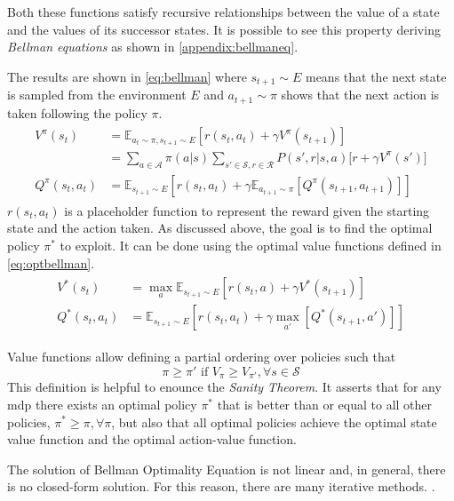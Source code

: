 Both these functions satisfy recursive relationships between the value of a state and the values of its successor states. It is possible to see this property deriving \textit{Bellman equations} as shown in \vref{appendix:bellmaneq}.

The results are shown in \vref{eq:bellman} where $s_{t+1}\sim \mathit{E}$ means that the next state is sampled from the environment $E$ and $a_{t+1}\sim \pi$ shows that the next action is taken following the policy $\pi$.
\begin{align} \label{eq:bellman}
	\begin{split}
V^\pi(s_t) &= \mathbb{E}_{a_t \sim \pi, s_{t+1} \sim E}[r(s_t, a_t) + \gamma V^\pi(s_{t+1})] \\
		&= \sum_{a \in \mathcal{A}}\pi(a|s)\sum_{s' \in \mathcal{S}, r \in \mathcal{R}}P(s', r | s, a)\big[r + \gamma V^\pi(s')\big]\\
Q^\pi(s_t,a_t) &= \mathbb{E}_{s_{t+1} \sim E}[r(s_t, a_t) + \gamma \mathbb{E}_{ a_{t+1} \sim \pi}[Q^\pi(s_{t+1}, a_{t+1})]]
\end{split}
\end{align}
 $r(s_t, a_t)$ is a placeholder function to represent the reward given the starting state and the action taken.
As discussed above, the goal is to find the optimal policy $\pi^*$ to exploit. It can be done using the optimal value functions defined in \vref{eq:optbellman}. 
\begin{align} \label{eq:optbellman}
\begin{split}
V^*(s_t) &= \max_{a} \mathbb{E}_{s_{t+1} \sim E}[r(s_t, a) + \gamma V^*(s_{t+1})] \\
Q^*(s_t,a_t) &= \mathbb{E}_{s_{t+1} \sim E}[r(s_t, a_t) + \gamma \max_{a'}[Q^*(s_{t+1}, a')]]
\end{split}
\end{align}

Value functions allow defining a partial ordering over policies such that \[\pi \ge \pi' \text{ if } V_\pi \ge V_{\pi'},\forall s \in \mathcal{S}\]
This definition is helpful to enounce the \textit{Sanity Theorem}. It asserts that for any \acrshort{mdp} there exists an optimal policy $\pi^*$ that is better than or equal to all other policies, $\pi^* \ge \pi, \forall \pi$, but also that all optimal policies achieve the optimal state value function and the optimal action-value function.

The solution of Bellman Optimality Equation is not linear and, in general, there is no closed-form solution. For this reason, there are many iterative methods.
.


